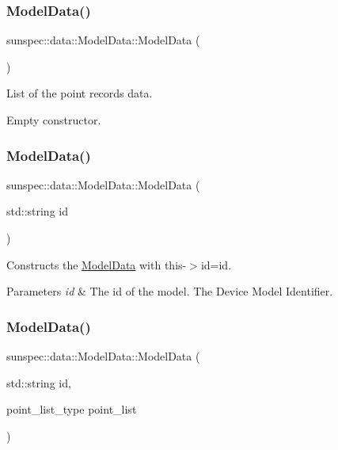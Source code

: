 \subsubsection{\texorpdfstring{Model\+Data()}{ModelData()}\hspace{0.1cm}{\footnotesize\ttfamily [1/4]}}
{\footnotesize\ttfamily sunspec\+::data\+::\+Model\+Data\+::\+Model\+Data (\begin{DoxyParamCaption}{ }\end{DoxyParamCaption})\hspace{0.3cm}{\ttfamily [default]}}



List of the point records\textquotesingle{} data. 

Empty constructor. \mbox{\label{structsunspec_1_1data_1_1_model_data_a4d6d2c13fa5269474abed182ef4f4c64}} 
\subsubsection{\texorpdfstring{Model\+Data()}{ModelData()}\hspace{0.1cm}{\footnotesize\ttfamily [2/4]}}
{\footnotesize\ttfamily sunspec\+::data\+::\+Model\+Data\+::\+Model\+Data (\begin{DoxyParamCaption}\item[{std\+::string}]{id }\end{DoxyParamCaption})\hspace{0.3cm}{\ttfamily [inline]}}

Constructs the \hyperlink{structsunspec_1_1data_1_1_model_data}{Model\+Data} with {\ttfamily this-\/$>$id=id}. 
\begin{DoxyParams}{Parameters}
{\em id} & The id of the model. The Device Model Identifier. \\
\hline
\end{DoxyParams}
\mbox{\label{structsunspec_1_1data_1_1_model_data_adcdfa2333a1448db04cf1cbe6ce9e964}} 
\subsubsection{\texorpdfstring{Model\+Data()}{ModelData()}\hspace{0.1cm}{\footnotesize\ttfamily [3/4]}}
{\footnotesize\ttfamily sunspec\+::data\+::\+Model\+Data\+::\+Model\+Data (\begin{DoxyParamCaption}\item[{std\+::string}]{id,  }\item[{point\+\_\+list\+\_\+type}]{point\+\_\+list }\end{DoxyParamCaption})\hspace{0.3cm}{\ttfamily [inline]}}

